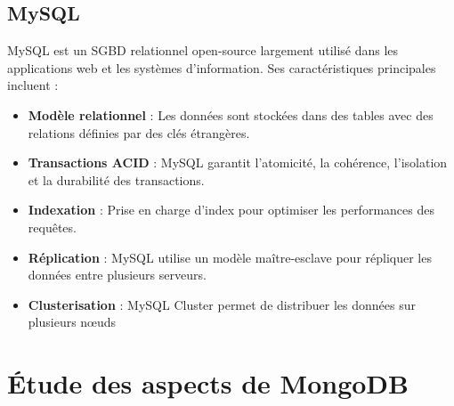 \documentclass[12pt,a4paper]{report}
\begin{document}
    \subsection{MySQL}
        \begin{card}
            MySQL est un SGBD relationnel open-source largement utilisé dans les applications web et les systèmes d'information. 
            Ses caractéristiques principales incluent :
            \begin{itemize}
                \item \textbf{Modèle relationnel} : Les données sont stockées dans des tables avec des relations définies par des clés étrangères.
                \item \textbf{Transactions ACID} : MySQL garantit l'atomicité, la cohérence, l'isolation et la durabilité des transactions.
                \item \textbf{Indexation} : Prise en charge d'index pour optimiser les performances des requêtes.
                \item \textbf{Réplication} : MySQL utilise un modèle maître-esclave pour répliquer les données entre plusieurs serveurs.
                \item \textbf{Clusterisation} : MySQL Cluster permet de distribuer les données sur plusieurs nœuds
            \end{itemize}
        \end{card}
        
\section{Étude des aspects de MongoDB}
\end{document}
